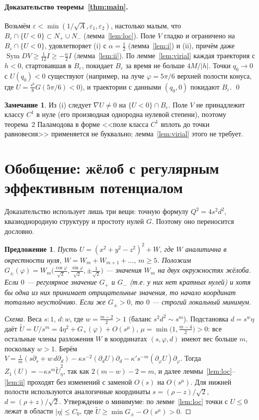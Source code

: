 \documentclass[11pt,a4paper]{article}
\newtheorem{proposition}{Предложение}
\theoremstyle{definition}
\newtheorem{remark}{Замечание}
\newcommand{\eps}{\varepsilon}
\DeclareMathOperator{\Sym}{Sym}
\newcommand{\tU}{\widetilde U}
\begin{document}
\paragraph{Доказательство теоремы~\ref{thm:main}.}
Возьмём $\eps<\min(1/\sqrt A,\eps_1,\eps_2)$, настолько малым, что $B_\eps\cap\{U<0\}\subset N_+\cup N_-$ (лемма~\ref{lem:loc}).
Поле $V$ гладко и ограничено на $B_\eps\cap\{U<0\}$, удовлетворяет (i) с $\alpha=\frac12$ (лемма~\ref{lem:i}) и (ii),
причём даже $\Sym DV\ge\frac1{12}I\ge-\frac\alpha2I$ (лемма~\ref{lem:ii}). По лемме~\ref{lem:virial} каждая траектория с
$h<0$, стартовавшая в $B_\eps$, покидает $B_\eps$ за время не больше $4M/|h|$. Точки $q_0\to0$ с $U(q_0)<0$
существуют (например, на луче $\varphi=5\pi/6$ верхней полости конуса, где $U=\frac{s^6}{8}G(5\pi/6)<0$), и
траектории с данными $(q_0,0)$ покидают $B_\eps$. \qed

\begin{remark}
Из (i) следует $\nabla U\ne0$ на $\{U<0\}\cap B_\eps$. Поле $V$ не принадлежит классу $C^1$ в нуле (его
производная однородна нулевой степени), поэтому теорема~2 Паламодова в форме <<поле класса $C^1$ вплоть до
точки равновесия>> применяется не буквально; лемма~\ref{lem:virial} этого не требует.
\end{remark}

\section{Обобщение: жёлоб с регулярным эффективным потенциалом}
Доказательство использует лишь три вещи: точную формулу $Q^2=4s^2d^2$, квазиоднородную структуру и простоту
нулей $G$. Поэтому оно переносится дословно.

\begin{proposition}\label{prop:gen}
Пусть $U=(x^2+y^2-z^2)^2+W$, где $W$ аналитична в окрестности нуля, $W=W_m+W_{m+1}+\dots$, $m\ge5$. Положим
$G_\pm(\varphi)=W_m\bigl(\tfrac{\cos\varphi}{\sqrt2},\tfrac{\sin\varphi}{\sqrt2},\pm\tfrac1{\sqrt2}\bigr)$ --- значения
$W_m$ на двух окружностях жёлоба. Если $0$ --- регулярное значение $G_+$ и $G_-$ (т.е. у них нет кратных нулей) и
хотя бы одна из них принимает отрицательные значения, то начало координат тотально неустойчиво. Если же
$G_\pm>0$, то $0$ --- строгий локальный минимум.
\end{proposition}
\begin{proof}[Схема]
Веса $s:1$, $d:w$, где $w=\frac{m-2}{2}>1$ (баланс $s^2d^2\sim s^m$). Подстановка $d=s^w\eta$ даёт
$\tU=U/s^m=4\eta^2+G_+(\varphi)+O(s^\mu)$, $\mu=\min\bigl(1,\frac{m-4}{2}\bigr)>0$: все остальные члены разложения $W$ в
координатах $(s,\varphi,d)$ имеют вес больше $m$, поскольку $w>1$. Берём $V=\frac1m(s\partial_s+w\,d\partial_d)
-\kappa s^{-2}(\partial_dU)\partial_d-\kappa' s^{-m}(\partial_\varphi U)\partial_\varphi$. Тогда $Z_1(U)=-\kappa s^m\tU_\eta^2$, так как
$2(m-w)-2=m$, и далее леммы~\ref{lem:loc}--\ref{lem:ii} проходят без изменений с заменой $O(s)$ на $O(s^\mu)$. Для нижней
полости используются аналогичные координаты $s=(\rho-z)/\sqrt2$, $d=(\rho+z)/\sqrt2$. Утверждение о минимуме:
по лемме~\ref{lem:loc} точки с $U\le0$ лежат в области $|\eta|\le C_0$, где $\tU\ge\min G_\pm-O(s^\mu)>0$.
\end{proof}
\end{document}
